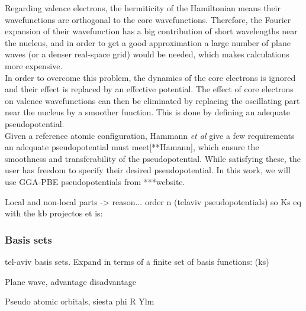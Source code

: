 Regarding valence electrons, the hermiticity of the Hamiltonian means their wavefunctions are orthogonal to the core wavefunctions. Therefore, the Fourier expansion of their wavefunction has a big contribution of short wavelengths near the nucleus, and in order to get a good approximation a large number of plane waves (or a denser real-space grid) would be needed, which makes calculations more expensive.\\

In order to overcome this problem, the dynamics of the core electrons is ignored and their effect is replaced by an effective potential. The effect of core electrons on valence wavefunctions can then be eliminated by replacing the oscillating part near the nucleus by a smoother function. This is done by defining an adequate pseudopotential.\\

Given a reference atomic configuration, Hammann \textit{et al} give a few requirements an adequate pseudopotential must meet[**Hamann], which ensure the smoothness and transferability of the pseudopotential. While satisfying these, the user has freedom to specify their desired pseudopotential. In this work, we will use GGA-PBE pseudopotentials from ***website.


Local and non-local parts -> reason... order n (telaviv pseudopotentials) so Ks eq with the kb projectos et is:

\subsubsection*{Basis sets}
tel-aviv basis sets.
Expand in terms of a finite set of basis functions: (ks)

Plane wave, advantage disadvantage

Pseudo atomic orbitals, siesta
phi R Ylm

